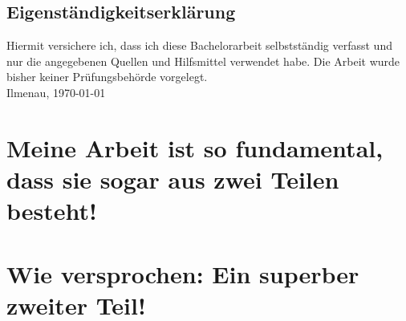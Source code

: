 \documentclass[DIV=11, pagesize, oneside, 11pt ]{scrbook} %
\begin{document}
\frontmatter
\clearpage
{}







\chapter*{Eigenständigkeitserklärung}
Hiermit versichere ich, dass ich diese Bachelorarbeit selbstständig verfasst und nur die angegebenen Quellen und Hilfsmittel verwendet habe. Die Arbeit wurde bisher keiner Prüfungsbehörde vorgelegt.
\\[20.ex]

\noindent Ilmenau,  \today \hspace{0.675\linewidth} 


\cleardoublepage
\hypersetup{linkcolor=black}
\tableofcontents
\hypersetup{linkcolor=mDarkTeal}



\mainmatter
{}


\part{Meine Arbeit ist so fundamental, dass sie sogar aus zwei Teilen besteht!} %

\part{Wie versprochen: Ein superber zweiter Teil!}




\backmatter
\printbibliography[title=Literaturverzeichnis]



\printglossary[type=symbols,style=topicmcols, title={Symbolverzeichnis}]



 
\end{document}
